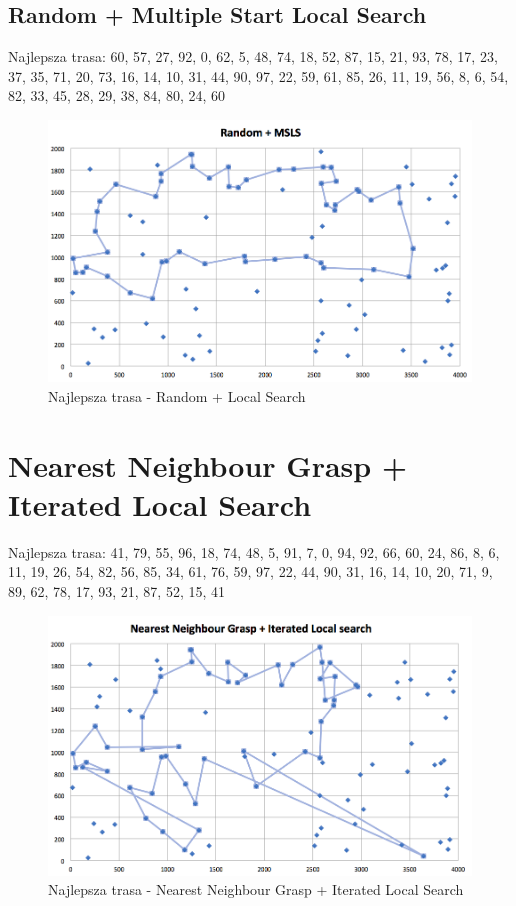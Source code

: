 \documentclass[a4paper 10pt]{article}
\begin{document}
\subsection{Random + Multiple Start Local Search}
Najlepsza trasa: 60, 57, 27, 92, 0, 62, 5, 48, 74, 18, 52, 87, 15, 21, 93, 78, 17, 23, 37, 35, 71, 20, 73, 16, 14, 10, 31, 44, 90, 97, 22, 59, 61, 85, 26, 11, 19, 56, 8, 6, 54, 82, 33, 45, 28, 29, 38, 84, 80, 24, 60 
\begin{figure} [H]
\centering
\includegraphics[angle=0,width = 1\textwidth, height=!]{images/Random_MSLS.png}
\caption{Najlepsza trasa - Random + Local Search}
\label{Rys. NN}
\end{figure}

\newpage
\section{Nearest Neighbour Grasp + Iterated Local Search}
Najlepsza trasa: 41, 79, 55, 96, 18, 74, 48, 5, 91, 7, 0, 94, 92, 66, 60, 24, 86, 8, 6, 11, 19, 26, 54, 82, 56, 85, 34, 61, 76, 59, 97, 22, 44, 90, 31, 16, 14, 10, 20, 71, 9, 89, 62, 78, 17, 93, 21, 87, 52, 15, 41 

\begin{figure} [H]
\centering
\includegraphics[angle=0,width = 1\textwidth, height=!]{images/NNG_ILS.png}
\caption{Najlepsza trasa - Nearest Neighbour Grasp + Iterated Local Search}
\label{Rys. NN}
\end{figure}
\end{document}
